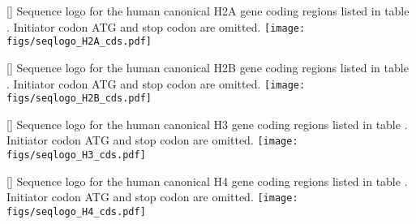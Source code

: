   \begin{center}
    \label{tab:difference-from-Marzluff02}
    
  \end{center}

  \newpage
  \label{tab:histone-catalogue}
  

  \newpage
  \begin{center}
    []{
        Sequence logo for the human canonical H2A gene coding regions
        listed in table .
        Initiator codon ATG and stop codon are omitted.
    }
    \label{fig:h2a-histone-gene-variation}
    \texttt{[image: figs/seqlogo\_H2A\_cds.pdf]}
  \end{center}
  \newpage
  \begin{center}
    []{
        Sequence logo for the human canonical H2B gene coding regions
        listed in table .
        Initiator codon ATG and stop codon are omitted.
    }
    \label{fig:h2b-histone-gene-variation}
    \texttt{[image: figs/seqlogo\_H2B\_cds.pdf]}
  \end{center}
  \newpage
  \begin{center}
    []{
        Sequence logo for the human canonical H3 gene coding regions
        listed in table .
        Initiator codon ATG and stop codon are omitted.
    }
    \label{fig:h3-histone-gene-variation}
    \texttt{[image: figs/seqlogo\_H3\_cds.pdf]}
  \end{center}
  \newpage
  \begin{center}
    []{
        Sequence logo for the human canonical H4 gene coding regions
        listed in table .
        Initiator codon ATG and stop codon are omitted.
    }
    \label{fig:h4-histone-gene-variation}
    \texttt{[image: figs/seqlogo\_H4\_cds.pdf]}
  \end{center}

